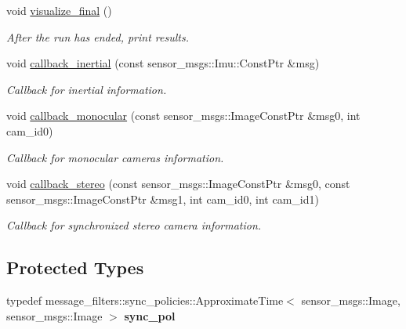 \begin{DoxyCompactItemize}
void \hyperlink{classov__msckf_1_1ROS1Visualizer_a08dbac86db9d9e7bfb80a1a10202df9e}{visualize\+\_\+final} ()
\begin{DoxyCompactList}\small\item\em After the run has ended, print results. \end{DoxyCompactList}\item 
\mbox{\label{classov__msckf_1_1ROS1Visualizer_a2f1cd044b066db51d6637933abed5549}} 
void \hyperlink{classov__msckf_1_1ROS1Visualizer_a2f1cd044b066db51d6637933abed5549}{callback\+\_\+inertial} (const sensor\+\_\+msgs\+::\+Imu\+::\+Const\+Ptr \&msg)
\begin{DoxyCompactList}\small\item\em Callback for inertial information. \end{DoxyCompactList}\item 
\mbox{\label{classov__msckf_1_1ROS1Visualizer_ac0e01dd741b752ba22e0e9eba40675a0}} 
void \hyperlink{classov__msckf_1_1ROS1Visualizer_ac0e01dd741b752ba22e0e9eba40675a0}{callback\+\_\+monocular} (const sensor\+\_\+msgs\+::\+Image\+Const\+Ptr \&msg0, int cam\+\_\+id0)
\begin{DoxyCompactList}\small\item\em Callback for monocular cameras information. \end{DoxyCompactList}\item 
\mbox{\label{classov__msckf_1_1ROS1Visualizer_a1f8e90c31c8b4b6dcd33e05b839cdaa2}} 
void \hyperlink{classov__msckf_1_1ROS1Visualizer_a1f8e90c31c8b4b6dcd33e05b839cdaa2}{callback\+\_\+stereo} (const sensor\+\_\+msgs\+::\+Image\+Const\+Ptr \&msg0, const sensor\+\_\+msgs\+::\+Image\+Const\+Ptr \&msg1, int cam\+\_\+id0, int cam\+\_\+id1)
\begin{DoxyCompactList}\small\item\em Callback for synchronized stereo camera information. \end{DoxyCompactList}\end{DoxyCompactItemize}
\subsection*{Protected Types}
\begin{DoxyCompactItemize}
\item 
\mbox{\label{classov__msckf_1_1ROS1Visualizer_a49f1e0c6fb04e4baa4ea64b0ae982056}} 
typedef message\+\_\+filters\+::sync\+\_\+policies\+::\+Approximate\+Time$<$ sensor\+\_\+msgs\+::\+Image, sensor\+\_\+msgs\+::\+Image $>$ {\bfseries sync\+\_\+pol}
\end{DoxyCompactItemize}
